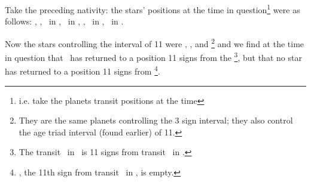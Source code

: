Take the preceding nativity: the stars’ positions at the time in question\footnote{i.e. take the planets transit positions at the time} were as follows: \Sun, \Jupiter, \Mercury\, in \Gemini, \Saturn\, in \Virgo, \Mars, \Venus\, in \Taurus, \Moon\, in \Pisces. 

\noindent Now the stars controlling the interval of 11 were \Saturn, \Jupiter, and \Venus\footnote{They are the same planets controlling the 3 sign interval; they also control the age triad interval (found earlier) of 11.} and we find at the time in question that \Venus\, has returned to a position 11 signs from the \Moon\footnote{The transit \Moon\, in \Pisces\, is 11 signs from transit \Venus\, in \Taurus.}, but that no star has returned to a position 11 signs from \Jupiter\footnote{\Aries, the 11th sign from transit \Jupiter\, in \Gemini, is empty.}. 

